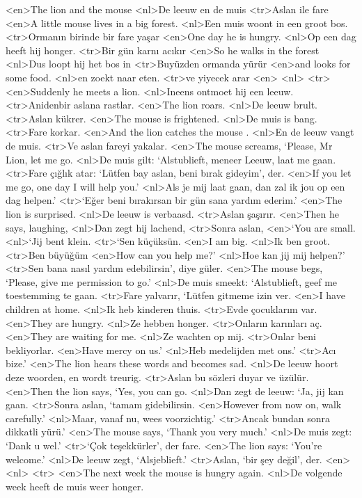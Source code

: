 <en>The lion and the mouse  
<nl>De leeuw en de muis  
<tr>Aslan ile fare 
<en>A little mouse lives in a big forest.
<nl>Een muis woont in een groot bos.
<tr>Ormanın birinde bir fare yaşar
<en>One day he is hungry.
<nl>Op een dag heeft hij honger. 
<tr>Bir gün karnı acıkır 
<en>So he walks in the forest
<nl>Dus loopt hij het bos in
<tr>Buyüzden ormanda yürür
<en>and looks for some food.
<nl>en zoekt naar eten.
<tr>ve yiyecek arar
<en>
<nl>
<tr>
<en>Suddenly he meets a lion.
<nl>Ineens ontmoet hij een leeuw.
<tr>Anidenbir aslana rastlar.
<en>The lion roars.
<nl>De leeuw brult.
<tr>Aslan  kükrer.
<en>The mouse is frightened.
<nl>De muis is bang.
<tr>Fare korkar.
<en>And the lion catches the mouse .
<nl>En de leeuw vangt de muis. 
<tr>Ve aslan fareyi yakalar.
<en>The mouse screams, `Please, Mr Lion, let me go.
<nl>De muis gilt: `Alstublieft, meneer Leeuw, laat me gaan.
<tr>Fare çığlık atar: `Lütfen bay aslan, beni bırak gideyim', der. 
<en>If you let me go, one day I will help you.'
<nl>Als je mij laat gaan, dan zal ik jou op een dag helpen.'
<tr>`Eğer beni bırakırsan bir gün sana yardım ederim.'
<en>The lion is surprised.
<nl>De leeuw is verbaasd.
<tr>Aslan şaşırır.
<en>Then he says, laughing, 
<nl>Dan zegt hij lachend,
<tr>Sonra aslan,
<en>`You are small.
<nl>`Jij bent klein.
<tr>`Sen küçüksün.
<en>I am big.
<nl>Ik ben groot.
<tr>Ben büyüğüm
<en>How can you help me?'
<nl>Hoe kan jij mij helpen?'
<tr>Sen bana nasıl yardım edebilirsin', diye güler.
<en>The mouse begs, `Please, give me permission to go.'
<nl>De muis smeekt: `Alstublieft, geef me toestemming te gaan.
<tr>Fare yalvarır, `Lütfen gitmeme izin ver.  
<en>I have children at home.
<nl>Ik heb kinderen thuis.
<tr>Evde çocuklarım var.
<en>They are hungry. 
<nl>Ze hebben honger.
<tr>Onların karınları aç. 
<en>They are waiting for me.
<nl>Ze wachten op mij. 
<tr>Onlar beni bekliyorlar. 
<en>Have mercy on us.'
<nl>Heb medelijden met ons.'
<tr>Acı bize.'
<en>The lion hears these words and becomes sad.
<nl>De leeuw hoort deze woorden, en wordt treurig.
<tr>Aslan bu sözleri duyar ve üzülür.
<en>Then the lion says, `Yes, you can go.
<nl>Dan zegt de leeuw: `Ja, jij kan gaan.
<tr>Sonra aslan, `tamam gidebilirsin.
<en>However from now on, walk carefully.'
<nl>Maar, vanaf nu, wees voorzichtig.'
<tr>Ancak  bundan sonra dikkatli yürü.'
<en>The mouse says, `Thank you very much.'
<nl>De muis zegt: `Dank u wel.'
<tr>`Çok teşekkürler', der fare.
<en>The lion says: `You’re welcome.'
<nl>De leeuw zegt, `Alsjeblieft.'
<tr>Aslan,  `bir şey değil', der.
<en>
<nl>
<tr>
<en>The next week the mouse is hungry again.
<nl>De volgende week heeft de muis weer honger.

